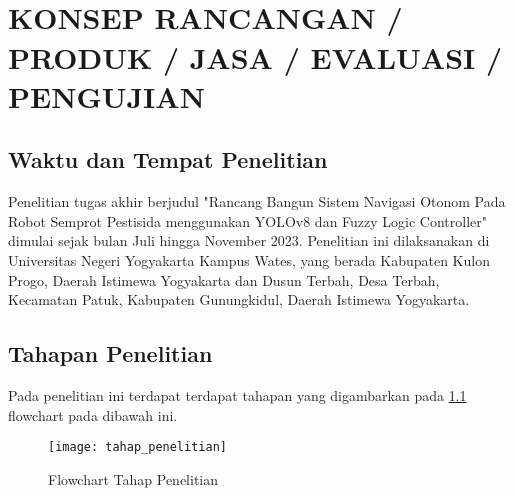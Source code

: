 
\chapter[KONSEP RANCANGAN / PRODUK / JASA / EVALUASI / PENGUJIAN]{\\ KONSEP RANCANGAN / PRODUK / JASA / EVALUASI / PENGUJIAN}

\section{Waktu dan Tempat Penelitian}
Penelitian tugas akhir berjudul "Rancang Bangun Sistem Navigasi Otonom Pada Robot Semprot Pestisida menggunakan YOLOv8 dan Fuzzy Logic Controller" dimulai sejak bulan Juli hingga November
2023. Penelitian ini dilaksanakan di Universitas Negeri Yogyakarta Kampus Wates, yang berada Kabupaten Kulon Progo, Daerah Istimewa Yogyakarta dan Dusun Terbah, Desa Terbah, Kecamatan Patuk, Kabupaten Gunungkidul, Daerah Istimewa Yogyakarta.

\section{Tahapan Penelitian}
Pada penelitian ini terdapat terdapat tahapan yang digambarkan pada  \cref{fig:flowchart} flowchart pada dibawah ini. 

\begin{figure}[H]
	\centering
	\texttt{[image: tahap\_penelitian]}
	\caption{Flowchart Tahap Penelitian}
	\label{fig:flowchart}
\end{figure}

